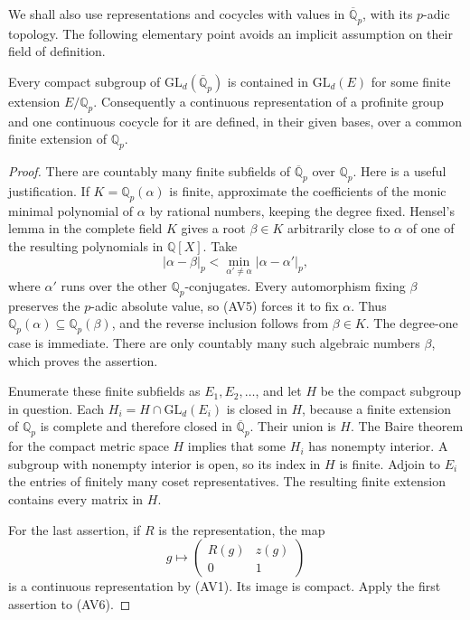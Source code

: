 We shall also use representations and cocycles with values in
$\overline{\mathbb Q}_p$, with its $p$-adic topology. The following
elementary point avoids an implicit assumption on their field
of definition.

\begin{lemma}\label{av-coefficients}
Every compact subgroup of
$\mathrm{GL}_d(\overline{\mathbb Q}_p)$ is contained in
$\mathrm{GL}_d(E)$ for some finite extension
$E/\mathbb Q_p$. Consequently a continuous representation of a
profinite group and one continuous cocycle for it are defined,
in their given bases, over a common finite extension of
$\mathbb Q_p$.
\end{lemma}
\begin{proof}
There are countably many finite subfields of
$\overline{\mathbb Q}_p$ over $\mathbb Q_p$. Here is a useful
justification. If $K=\mathbb Q_p(\alpha)$ is finite, approximate
the coefficients of the monic minimal polynomial of $\alpha$
by rational numbers, keeping the degree fixed. Hensel's lemma
in the complete field $K$ gives a root $\beta\in K$ arbitrarily
close to $\alpha$ of one of the resulting polynomials in
$\mathbb Q[X]$. Take
\[
 |\alpha-\beta|_p<
        \min_{\alpha'\ne\alpha}|\alpha-\alpha'|_p,
                                                               \tag{AV5}
\]
where $\alpha'$ runs over the other $\mathbb Q_p$-conjugates.
Every automorphism fixing $\beta$ preserves the $p$-adic
absolute value, so (AV5) forces it to fix $\alpha$.
Thus $\mathbb Q_p(\alpha)\subseteq\mathbb Q_p(\beta)$,
and the reverse inclusion follows from $\beta\in K$.
The degree-one case is immediate. There are only countably
many such algebraic numbers $\beta$, which proves the assertion.

Enumerate these finite subfields as $E_1,E_2,\ldots$, and let
$H$ be the compact subgroup in question. Each
$H_i=H\cap\mathrm{GL}_d(E_i)$ is closed in $H$, because a
finite extension of $\mathbb Q_p$ is complete and therefore
closed in $\overline{\mathbb Q}_p$. Their union is $H$.
The Baire theorem for the compact metric space $H$ implies
that some $H_i$ has nonempty interior. A subgroup with
nonempty interior is open, so its index in $H$ is finite.
Adjoin to $E_i$ the entries of finitely many coset
representatives. The resulting finite extension contains
every matrix in $H$.

For the last assertion, if $R$ is the representation, the map
\[
       g\longmapsto
       \begin{pmatrix}R(g)&z(g)\\0&1\end{pmatrix}               \tag{AV6}
\]
is a continuous representation by (AV1). Its image is compact.
Apply the first assertion to (AV6).
\end{proof}

